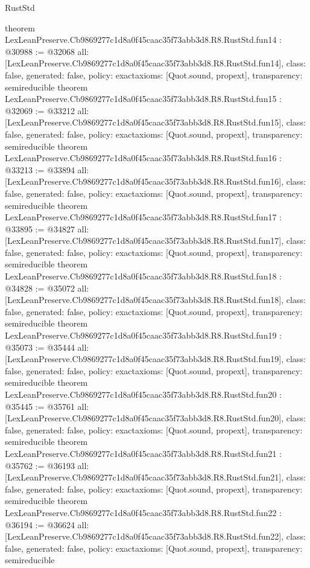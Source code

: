 \begin{lexlean}{RustStd}
\begin{coremodule}
{}
theorem LexLeanPreserve.Cb9869277c1d8a0f45caac35f73abb3d8.R8.RustStd.fun14 : @30988 := @32068 {
  all: [LexLeanPreserve.Cb9869277c1d8a0f45caac35f73abb3d8.R8.RustStd.fun14],
  class: false,
  generated: false,
  policy: exact{axioms: [Quot.sound, propext]},
  transparency: semireducible
}
theorem LexLeanPreserve.Cb9869277c1d8a0f45caac35f73abb3d8.R8.RustStd.fun15 : @32069 := @33212 {
  all: [LexLeanPreserve.Cb9869277c1d8a0f45caac35f73abb3d8.R8.RustStd.fun15],
  class: false,
  generated: false,
  policy: exact{axioms: [Quot.sound, propext]},
  transparency: semireducible
}
theorem LexLeanPreserve.Cb9869277c1d8a0f45caac35f73abb3d8.R8.RustStd.fun16 : @33213 := @33894 {
  all: [LexLeanPreserve.Cb9869277c1d8a0f45caac35f73abb3d8.R8.RustStd.fun16],
  class: false,
  generated: false,
  policy: exact{axioms: [Quot.sound, propext]},
  transparency: semireducible
}
theorem LexLeanPreserve.Cb9869277c1d8a0f45caac35f73abb3d8.R8.RustStd.fun17 : @33895 := @34827 {
  all: [LexLeanPreserve.Cb9869277c1d8a0f45caac35f73abb3d8.R8.RustStd.fun17],
  class: false,
  generated: false,
  policy: exact{axioms: [Quot.sound, propext]},
  transparency: semireducible
}
theorem LexLeanPreserve.Cb9869277c1d8a0f45caac35f73abb3d8.R8.RustStd.fun18 : @34828 := @35072 {
  all: [LexLeanPreserve.Cb9869277c1d8a0f45caac35f73abb3d8.R8.RustStd.fun18],
  class: false,
  generated: false,
  policy: exact{axioms: [Quot.sound, propext]},
  transparency: semireducible
}
theorem LexLeanPreserve.Cb9869277c1d8a0f45caac35f73abb3d8.R8.RustStd.fun19 : @35073 := @35444 {
  all: [LexLeanPreserve.Cb9869277c1d8a0f45caac35f73abb3d8.R8.RustStd.fun19],
  class: false,
  generated: false,
  policy: exact{axioms: [Quot.sound, propext]},
  transparency: semireducible
}
theorem LexLeanPreserve.Cb9869277c1d8a0f45caac35f73abb3d8.R8.RustStd.fun20 : @35445 := @35761 {
  all: [LexLeanPreserve.Cb9869277c1d8a0f45caac35f73abb3d8.R8.RustStd.fun20],
  class: false,
  generated: false,
  policy: exact{axioms: [Quot.sound, propext]},
  transparency: semireducible
}
theorem LexLeanPreserve.Cb9869277c1d8a0f45caac35f73abb3d8.R8.RustStd.fun21 : @35762 := @36193 {
  all: [LexLeanPreserve.Cb9869277c1d8a0f45caac35f73abb3d8.R8.RustStd.fun21],
  class: false,
  generated: false,
  policy: exact{axioms: [Quot.sound, propext]},
  transparency: semireducible
}
theorem LexLeanPreserve.Cb9869277c1d8a0f45caac35f73abb3d8.R8.RustStd.fun22 : @36194 := @36624 {
  all: [LexLeanPreserve.Cb9869277c1d8a0f45caac35f73abb3d8.R8.RustStd.fun22],
  class: false,
  generated: false,
  policy: exact{axioms: [Quot.sound, propext]},
  transparency: semireducible
}
\end{coremodule}
\end{lexlean}
